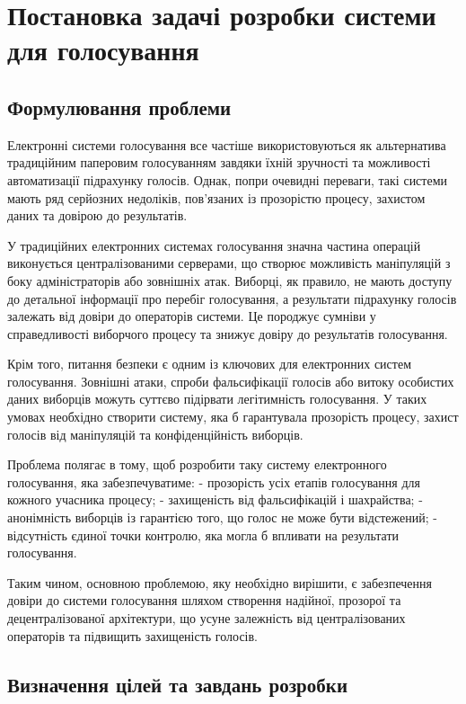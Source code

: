 \documentclass[14pt]{extreport}
\begin{document}
  \chapter{Постановка задачі розробки системи для голосування}

  \section{Формулювання проблеми}
  
  Електронні системи голосування все частіше використовуються як альтернатива традиційним паперовим голосуванням завдяки їхній зручності та можливості автоматизації підрахунку голосів. Однак, попри очевидні переваги, такі системи мають ряд серйозних недоліків, пов’язаних із прозорістю процесу, захистом даних та довірою до результатів.

У традиційних електронних системах голосування значна частина операцій виконується централізованими серверами, що створює можливість маніпуляцій з боку адміністраторів або зовнішніх атак. Виборці, як правило, не мають доступу до детальної інформації про перебіг голосування, а результати підрахунку голосів залежать від довіри до операторів системи. Це породжує сумніви у справедливості виборчого процесу та знижує довіру до результатів голосування.

Крім того, питання безпеки є одним із ключових для електронних систем голосування. Зовнішні атаки, спроби фальсифікації голосів або витоку особистих даних виборців можуть суттєво підірвати легітимність голосування. У таких умовах необхідно створити систему, яка б гарантувала прозорість процесу, захист голосів від маніпуляцій та конфіденційність виборців.

Проблема полягає в тому, щоб розробити таку систему електронного голосування, яка забезпечуватиме:  
- прозорість усіх етапів голосування для кожного учасника процесу;  
- захищеність від фальсифікацій і шахрайства;  
- анонімність виборців із гарантією того, що голос не може бути відстежений;  
- відсутність єдиної точки контролю, яка могла б впливати на результати голосування.

Таким чином, основною проблемою, яку необхідно вирішити, є забезпечення довіри до системи голосування шляхом створення надійної, прозорої та децентралізованої архітектури, що усуне залежність від централізованих операторів та підвищить захищеність голосів.

  \section{Визначення цілей та завдань розробки}
\end{document}
